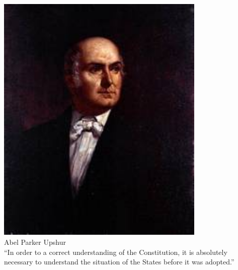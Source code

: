 \begin{frame}
    \begin{columns}[onlytextwidth]
            \centering
            \includegraphics[width=0.75\textwidth]{img/upshur.jpg} \\
            Abel Parker Upshur \\

            ``In order to a correct understanding of the Constitution, it is absolutely necessary to understand the situation of the States before it was adopted.''
    \end{columns}
\end{frame}

